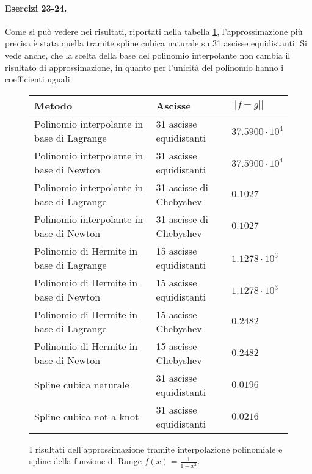 \paragraph{Esercizi 23-24.} Come si può vedere nei risultati, riportati nella tabella \ref{fig:approxRunge}, l'approssimazione più precisa è stata quella tramite spline cubica naturale su 31 ascisse equidistanti. Si vede anche, che la scelta della base del polinomio interpolante non cambia il risultato di approssimazione, in quanto per l'unicità del polinomio hanno i coefficienti uguali.

\begin{figure}
  \centering
  \begin{tabular}{|p{0.5\linewidth}|p{0.3\linewidth}|p{0.2\linewidth}|}
    \hline
    Metodo & Ascisse & $||f - g||$ \\
    \hline\hline
    
    Polinomio interpolante in base di Lagrange & 31 ascisse equidistanti & $37.5900 \cdot 10^4$ \\
    \hline
    Polinomio interpolante in base di Newton & 31 ascisse equidistanti & $37.5900 \cdot 10^4$ \\
    \hline
    Polinomio interpolante in base di Lagrange & 31 ascisse di Chebyshev & $0.1027$ \\
    \hline
    Polinomio interpolante in base di Newton & 31 ascisse di Chebyshev & $0.1027$ \\
    \hline
    Polinomio di Hermite in base di Lagrange & 15 ascisse equidistanti & $1.1278 \cdot 10^3$ \\
    \hline
    Polinomio di Hermite in base di Newton & 15 ascisse equidistanti & $1.1278 \cdot 10^3$ \\
    \hline
    Polinomio di Hermite in base di Lagrange & 15 ascisse Chebyshev & $0.2482$ \\
    \hline
    Polinomio di Hermite in base di Newton & 15 ascisse Chebyshev & $0.2482$ \\
    \hline
    Spline cubica naturale & 31 ascisse equidistanti & $0.0196$ \\
    \hline
    Spline cubica not-a-knot & 31 ascisse equidistanti & $0.0216$ \\
    \hline
  \end{tabular}
  \caption{I risultati dell'approssimazione tramite interpolazione polinomiale e spline della funzione di Runge $f(x) = \frac{1}{1 + x^2}$.}
  \label{fig:approxRunge}
\end{figure}

